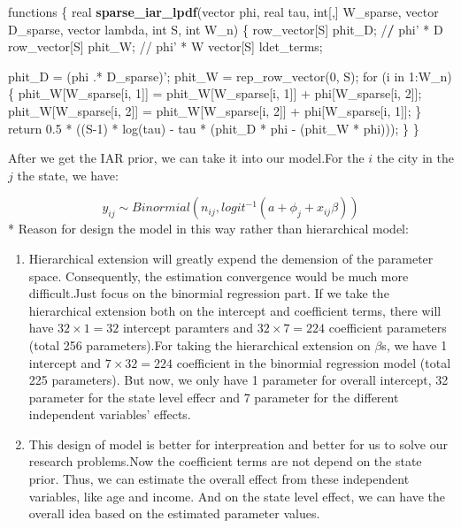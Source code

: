 \documentclass[]{tufte-handout}
\newenvironment{Shaded}{}{}
\newcommand{\ErrorTok}[1]{\textcolor[rgb]{1.00,0.00,0.00}{\textbf{#1}}}
\newcommand{\KeywordTok}[1]{\textcolor[rgb]{0.00,0.44,0.13}{\textbf{#1}}}
\newcommand{\NormalTok}[1]{#1}
\newcommand{\OperatorTok}[1]{\textcolor[rgb]{0.40,0.40,0.40}{#1}}
\newcommand{\StringTok}[1]{\textcolor[rgb]{0.25,0.44,0.63}{#1}}
\begin{document}
\begin{Shaded}
\begin{Highlighting}[]
\NormalTok{functions \{}
\NormalTok{  real }\KeywordTok{sparse_iar_lpdf}\NormalTok{(vector phi, real tau, int[,] W_sparse, vector D_sparse, vector lambda, int S, int W_n) \{}
\NormalTok{      row_vector[S] phit_D; }\OperatorTok{/}\ErrorTok{/}\StringTok{ }\NormalTok{phi}\StringTok{' * D}
\StringTok{      row_vector[S] phit_W; // phi'} \OperatorTok{*}\StringTok{ }\NormalTok{W}
\NormalTok{      vector[S] ldet_terms;}
    
\NormalTok{      phit_D =}\StringTok{ }\NormalTok{(phi .}\OperatorTok{*}\StringTok{ }\NormalTok{D_sparse)}\StringTok{';}
\StringTok{      phit_W = rep_row_vector(0, S);}
\StringTok{      for (i in 1:W_n) \{}
\StringTok{        phit_W[W_sparse[i, 1]] = phit_W[W_sparse[i, 1]] + phi[W_sparse[i, 2]];}
\StringTok{        phit_W[W_sparse[i, 2]] = phit_W[W_sparse[i, 2]] + phi[W_sparse[i, 1]];}
\StringTok{      \}}
\StringTok{    }
\StringTok{      return 0.5 * ((S-1) * log(tau)}
\StringTok{                    - tau * (phit_D * phi - (phit_W * phi)));}
\StringTok{  \}}
\StringTok{\}}
\end{Highlighting}
\end{Shaded}

After we get the IAR prior, we can take it into our model.For the \(i\)
the city in the \(j\) the state, we have:

\[ y_{ij} \sim Binormial(n_{ij},logit^{-1}(a + \phi_j + x_{ij}\beta)) \]
* Reason for design the model in this way rather than hierarchical
model:

\begin{enumerate}
\def\labelenumi{\arabic{enumi}.}
\item
  Hierarchical extension will greatly expend the demension of the
  parameter space. Consequently, the estimation convergence would be
  much more difficult.Just focus on the binormial regression part. If we
  take the hierarchical extension both on the intercept and coefficient
  terms, there will have \(32 \times 1 = 32\) intercept paramters and
  \(32 \times 7 = 224\) coefficient parameters (total 256
  parameters).For taking the hierarchical extension on \(\beta\)s, we
  have 1 intercept and \(7 \times 32 = 224\) coefficient in the
  binormial regression model (total 225 parameters). But now, we only
  have 1 parameter for overall intercept, 32 parameter for the state
  level effecr and 7 parameter for the different independent variables'
  effects.
\item
  This design of model is better for interpreation and better for us to
  solve our research problems.Now the coefficient terms are not depend
  on the state prior. Thus, we can estimate the overall effect from
  these independent variables, like age and income. And on the state
  level effect, we can have the overall idea based on the estimated
  parameter values.
\end{enumerate}
\end{document}
